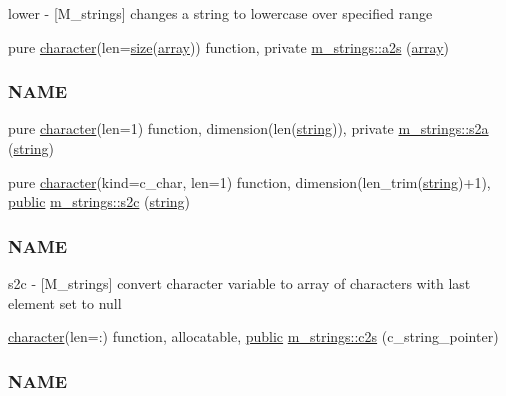\begin{DoxyCompactItemize}
\begin{DoxyCompactList}
lower -\/ \mbox{[}M\+\_\+strings\mbox{]} changes a string to lowercase over specified range \end{DoxyCompactList}\item 
pure \hyperlink{option__stopwatch_83_8txt_abd4b21fbbd175834027b5224bfe97e66}{character}(len=\hyperlink{what__overview_81_8txt_ab5692ed87074f1d5ec850a9ffa8b5af9}{size}(\hyperlink{intro__blas1_83_8txt_a89db1945e1a335ab0184c6a097821e32}{array})) function, private \hyperlink{namespacem__strings_a9365ae5277199446d93fc5208be2e9a5}{m\+\_\+strings\+::a2s} (\hyperlink{intro__blas1_83_8txt_a89db1945e1a335ab0184c6a097821e32}{array})
\begin{DoxyCompactList}\small\item\em \subsubsection*{N\+A\+ME}\end{DoxyCompactList}\item 
pure \hyperlink{option__stopwatch_83_8txt_abd4b21fbbd175834027b5224bfe97e66}{character}(len=1) function, dimension(len(\hyperlink{what__overview_81_8txt_a74cb7e955273b9f9157b4f0c18a38849}{string})), private \hyperlink{namespacem__strings_a5b05f337c8851871a4fb0b3cf56663cd}{m\+\_\+strings\+::s2a} (\hyperlink{what__overview_81_8txt_a74cb7e955273b9f9157b4f0c18a38849}{string})
\item 
pure \hyperlink{option__stopwatch_83_8txt_abd4b21fbbd175834027b5224bfe97e66}{character}(kind=c\+\_\+char, len=1) function, dimension(len\+\_\+trim(\hyperlink{what__overview_81_8txt_a74cb7e955273b9f9157b4f0c18a38849}{string})+1), \hyperlink{M__stopwatch_83_8txt_a2f74811300c361e53b430611a7d1769f}{public} \hyperlink{namespacem__strings_a9a3d38d8e7c4212d63487b9b46bec3b7}{m\+\_\+strings\+::s2c} (\hyperlink{what__overview_81_8txt_a74cb7e955273b9f9157b4f0c18a38849}{string})
\begin{DoxyCompactList}\small\item\em \subsubsection*{N\+A\+ME}

s2c -\/ \mbox{[}M\+\_\+strings\mbox{]} convert character variable to array of characters with last element set to null \end{DoxyCompactList}\item 
\hyperlink{option__stopwatch_83_8txt_abd4b21fbbd175834027b5224bfe97e66}{character}(len=\+:) function, allocatable, \hyperlink{M__stopwatch_83_8txt_a2f74811300c361e53b430611a7d1769f}{public} \hyperlink{namespacem__strings_a0a8c0c16a34208351523068686cb743b}{m\+\_\+strings\+::c2s} (c\+\_\+string\+\_\+pointer)
\begin{DoxyCompactList}\small\item\em \subsubsection*{N\+A\+ME}


\end{DoxyCompactList}
\end{DoxyCompactItemize}
